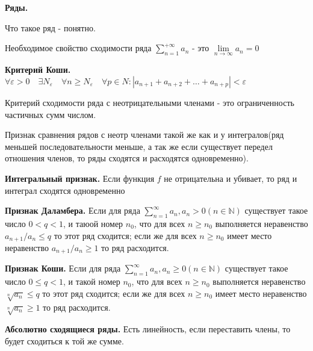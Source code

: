 {\large\textbf{Ряды.} }

Что такое ряд - понятно.

Необходимое свойство сходимости ряда $\sum\limits_{n=1}^{+\infty} a_n$ - это
$\lim\limits_{n \to \infty} a_n = 0$

\textbf{Критерий Коши.} $
\forall \varepsilon>0 \quad \exists N_{\varepsilon} \quad \forall n \geqslant N_{\varepsilon} \quad \forall p \in N:\left|a_{n+1}+a_{n+2}+\ldots+a_{n+p}\right|<\varepsilon
$

Критерий сходимости ряда с неотрицательными членами - это ограниченность частичных сумм
числом.

Признак сравнения рядов с неотр членами такой же как и у интегралов(ряд меньшей
последовательности меньше, а так же если существует передел отношения членов,
то ряды сходятся и расходятся одновременно).

\textbf{Интегральный признак.} Если функция $f$ не отрицательна и убивает, то 
ряд и интеграл сходятся одновременно

\textbf{Признак Даламбера.} Если для ряда
$
\sum\limits_{n=1}^{\infty} a_{n}, a_{n}>0 (n \in \mathbb{N})
$
существует такое число $0<q<1$, и таюой номер $n_{0}$, что для всех $n \geqslant n_{0}$ выполняется неравенство
$ a_{n+1} / a_{n} \leqslant q $
то этот ряд сходится; если же для всех $n \geqslant n_{0}$ имеет место неравенство
$ a_{n+1} / a_{n} \geqslant 1 $
то ряд расходится.

\textbf{Признак Коши.} Если для ряда
$ \sum\limits_{n=1}^{\infty} a_{n}, a_{n} \geqslant 0 (n \in \mathbb{N}) $
существует такое число $0 \leqslant q<1$, и такой номер $n_{0}$, что для всех $n \geqslant n_{0}$ выполняется неравенство
$ \sqrt[n]{a_{n}} \leqslant q $
то этот ряд сходится; если же для всех $n \geqslant n_{0}$ имеет место неравенство
$ \sqrt[n]{a_{n}} \geqslant 1 $ то ряд расходится.

\textbf{Абсолютно сходящиеся ряды.} Есть линейность, если переставить члены,
то будет сходиться к той же сумме.
